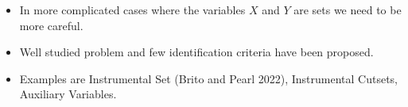 \documentclass{beamer}
\begin{document}
\begin{frame}
	\frametitle{}
	\begin{itemize}
		\item In more complicated cases where the variables $ X $ and $ Y $ are sets we need to be more careful.
		\item Well studied problem and few identification criteria have been proposed.
		\item Examples are Instrumental Set (Brito and Pearl 2022), Instrumental Cutsets, Auxiliary Variables.
	\end{itemize}
\end{frame}
\end{document}

